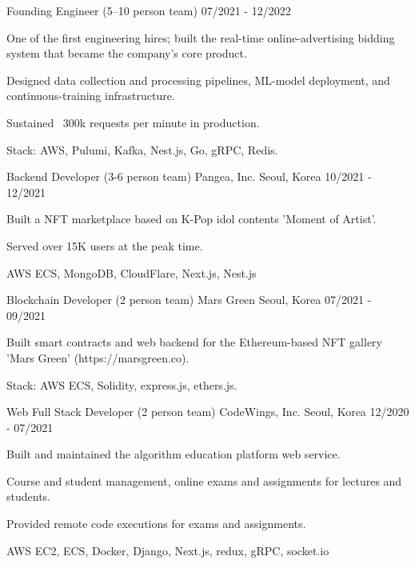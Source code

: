 \cventry
{Founding Engineer (5--10 person team)} %
{} %
{} %
{07/2021 - 12/2022} %
\begin{cvitems}
\item {One of the first engineering hires; built the real-time online-advertising bidding system that became the company's core product.}
\item {Designed data collection and processing pipelines, ML-model deployment, and continuous-training infrastructure.}
\item {Sustained ~300k requests per minute in production.}
\item {Stack: AWS, Pulumi, Kafka, Nest.js, Go, gRPC, Redis.}
\end{cvitems}

\cventry
{Backend Developer (3-6 person team)} %
{Pangea, Inc.} %
{Seoul, Korea} %
{10/2021 - 12/2021} %
\begin{cvitems}
\item {Built a NFT marketplace based on K-Pop idol contents 'Moment of Artist'.}
\item {Served over 15K users at the peak time.}
\item {AWS ECS, MongoDB, CloudFlare, Next.js, Nest.js}
\end{cvitems}

\cventry
{Blockchain Developer (2 person team)} %
{Mars Green} %
{Seoul, Korea} %
{07/2021 - 09/2021} %
\begin{cvitems}
\item {Built smart contracts and web backend for the Ethereum-based NFT gallery 'Mars Green' (https://marsgreen.co).}
\item {Stack: AWS ECS, Solidity, express.js, ethers.js.}
\end{cvitems}

\cventry
{Web Full Stack Developer (2 person team)} %
{CodeWings, Inc.} %
{Seoul, Korea} %
{12/2020 - 07/2021} %
\begin{cvitems}
\item {Built and maintained the algorithm education platform web service.}
\item {Course and student management, online exams and assignments for lectures and students.}
\item {Provided remote code executions for exams and assignments.}
\item {AWS EC2, ECS, Docker, Django, Next.js, redux, gRPC, socket.io}
\end{cvitems}
